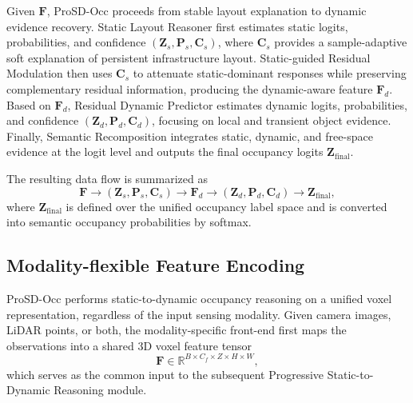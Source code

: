 Given $\bm{F}$, ProSD-Occ proceeds from stable layout explanation to dynamic
evidence recovery. Static Layout Reasoner first estimates static logits,
probabilities, and confidence $(\bm{Z}_{s},\bm{P}_{s},\bm{C}_{s})$, where
$\bm{C}_{s}$ provides a sample-adaptive soft explanation of persistent
infrastructure layout. Static-guided Residual Modulation then uses
$\bm{C}_{s}$ to attenuate static-dominant responses while preserving
complementary residual information, producing the dynamic-aware feature
$\bm{F}_{d}$. Based on $\bm{F}_{d}$, Residual Dynamic Predictor estimates
dynamic logits, probabilities, and confidence
$(\bm{Z}_{d},\bm{P}_{d},\bm{C}_{d})$, focusing on local and transient object
evidence. Finally, Semantic Recomposition integrates static, dynamic, and
free-space evidence at the logit level and outputs the final occupancy logits
$\bm{Z}_{\mathrm{final}}$.

The resulting data flow is summarized as
\begin{equation}
  \bm{F}
  \rightarrow
  (\bm{Z}_{s},\bm{P}_{s},\bm{C}_{s})
  \rightarrow
  \bm{F}_{d}
  \rightarrow
  (\bm{Z}_{d},\bm{P}_{d},\bm{C}_{d})
  \rightarrow
  \bm{Z}_{\mathrm{final}},
\end{equation}
where $\bm{Z}_{\mathrm{final}}$ is defined over the unified occupancy label
space and is converted into semantic occupancy probabilities by softmax.

\subsection{Modality-flexible Feature Encoding}
\label{sec:prosd_modality_flexible}
ProSD-Occ performs static-to-dynamic occupancy reasoning on a unified voxel
representation, regardless of the input sensing modality. Given camera images,
LiDAR points, or both, the modality-specific front-end first maps the
observations into a shared 3D voxel feature tensor
\begin{equation}
  \bm{F}\in\mathbb{R}^{B\times C_f\times Z\times H\times W},
\end{equation}
which serves as the common input to the subsequent Progressive
Static-to-Dynamic Reasoning module.


